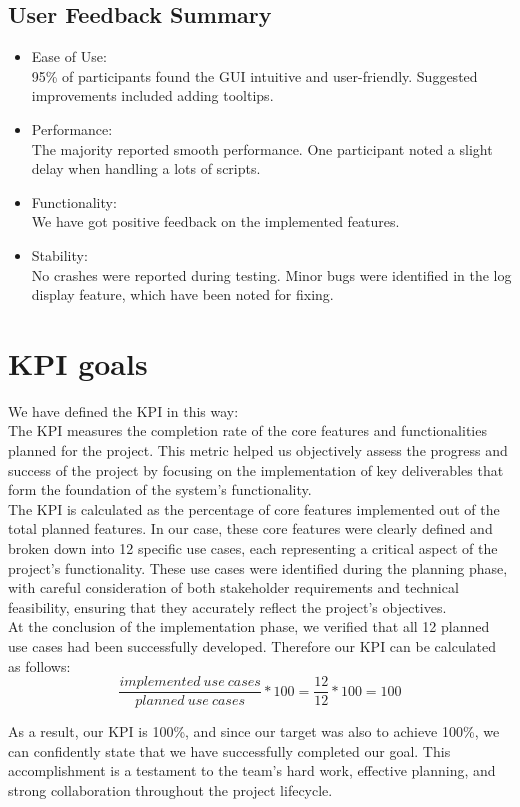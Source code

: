 \documentclass{article}
\begin{document}
\subsection{User Feedback Summary}
\begin{itemize}
    \item Ease of Use:\\
    95\% of participants found the GUI intuitive and user-friendly. Suggested improvements included adding tooltips.
    \item Performance:\\
    The majority reported smooth performance. One participant noted a slight delay when handling a lots of scripts.
    \item Functionality:\\
    We have got positive feedback on the implemented features.
    \item Stability:\\
    No crashes were reported during testing. Minor bugs were identified in the log display feature, which have been noted for fixing.
\end{itemize}

\section{KPI goals}
We have defined the KPI in this way: \\
The KPI measures the completion rate of the core features and functionalities planned for the project.
This metric helped us objectively assess the progress and success of the project by focusing on the implementation of key deliverables that form the foundation of the system's functionality. \\
The KPI is calculated as the percentage of core features implemented out of the total planned features. In our case, these core features were clearly defined and broken down into 12 specific use cases, each representing a critical aspect of the project's functionality. These use cases were identified during the planning phase, with careful consideration of both stakeholder requirements and technical feasibility, ensuring that they accurately reflect the project's objectives. \\
At the conclusion of the implementation phase, we verified that all 12 planned use cases had been successfully developed. Therefore our KPI can be calculated as follows:
\[ \frac{implemented\ use\ cases}{planned\ use\ cases} * 100 = \frac{12}{12}*100 = 100 \]

As a result, our KPI is 100\%, and since our target was also to achieve 100\%, we can confidently state that we have successfully completed our goal. This accomplishment is a testament to the team's hard work, effective planning, and strong collaboration throughout the project lifecycle.
\end{document}
